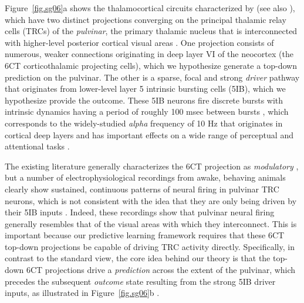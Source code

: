 \documentclass[11pt,twoside]{article}
\newif\myifpdf
\begin{document}
Figure~\ref{fig.sg06}a shows the thalamocortical circuits characterized by \citet{ShermanGuillery06} (see also \citealp{ShermanGuillery13,UsreySherman18}), which have two distinct projections converging on the principal thalamic relay cells (TRCs) of the \emph{pulvinar}, the primary thalamic nucleus that is interconnected with higher-level posterior cortical visual areas \citep{Shipp03,ArcaroPinskKastner15,HalassaKastner17}.  One projection consists of numerous, weaker connections originating in deep layer VI of the neocortex (the 6CT corticothalamic projecting cells), which we hypothesize generate a top-down prediction on the pulvinar.  The other is a sparse, focal \citep{Rockland98a,Rockland96} and strong \emph{driver} pathway that originates from lower-level layer 5 intrinsic bursting cells (5IB), which we hypothesize provide the outcome.  These 5IB neurons fire discrete bursts with intrinsic dynamics having a period of roughly 100 msec between bursts \citep{ConnorsGutnickPrince82,SilvaAmitaiConnors91,LarkumZhuSakmann99,FranceschettiGuatteoPanzicaEtAl95,SaalmannPinskWangEtAl12}, which corresponds to the widely-studied \emph{alpha} frequency of 10 Hz that originates in cortical deep layers and has important effects on a wide range of perceptual and attentional tasks \citep{BuffaloFriesLandmanEtAl11,VanRullenKoch03,MathewsonGrattonFabianiEtAl09,JensenBonnefondVanRullen12,ClaytonYeungKadosh18}.

The existing literature generally characterizes the 6CT projection as \emph{modulatory} \citep{ShermanGuillery13,UsreySherman18}, but a number of electrophysiological recordings from awake, behaving animals clearly show sustained, continuous patterns of neural firing in pulvinar TRC neurons, which is not consistent with the idea that they are only being driven by their 5IB inputs \citep{Bender82,PetersenRobinsonKeys85,BenderYouakim01,Robinson93,SaalmannPinskWangEtAl12,KomuraNikkuniHirashimaEtAl13,ZhouSchaferDesimone16}.  Indeed, these recordings show that pulvinar neural firing generally resembles that of the visual areas with which they interconnect.  This is important because our predictive learning framework requires that these 6CT top-down projections be capable of driving TRC activity directly.  Specifically, in contrast to the standard view, the core idea behind our theory is that the top-down 6CT projections drive a \emph{prediction} across the extent of the pulvinar, which precedes the subsequent \emph{outcome} state resulting from the strong 5IB driver inputs, as illustrated in Figure~\ref{fig.sg06}b \citep{KachergisWyatteOReillyEtAl14,OReillyWyatteRohrlich14,OReillyWyatteRohrlich17}.  
\end{document}
